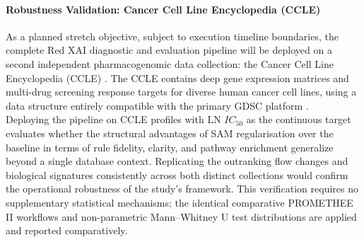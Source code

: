 \paragraph{Robustness Validation: Cancer Cell Line Encyclopedia (CCLE)}
\label{para:robustness_ccle}
As a planned stretch objective, subject to execution timeline boundaries, the complete 
Red XAI diagnostic and evaluation pipeline will be deployed on a second independent 
pharmacogenomic data collection: the Cancer Cell Line Encyclopedia (CCLE) 
\cite{Barretina2012}. The CCLE contains deep gene expression matrices and multi-drug 
screening response targets for diverse human cancer cell lines, using a data structure 
entirely compatible with the primary GDSC platform \cite{Baptista2021, Partin2023}. 
\\
Deploying the pipeline on CCLE profiles with $\text{LN } IC_{50}$ as the continuous target 
evaluates whether the structural advantages of SAM regularisation over the baseline 
in terms of rule fidelity, clarity, and pathway enrichment generalize beyond a single 
database context. Replicating the outranking flow changes and biological signatures 
consistently across both distinct collections would confirm the operational robustness 
of the study's framework. This verification requires no supplementary statistical 
mechanisms; the identical comparative PROMETHEE II workflows and non-parametric 
Mann--Whitney U test distributions are applied and reported comparatively.